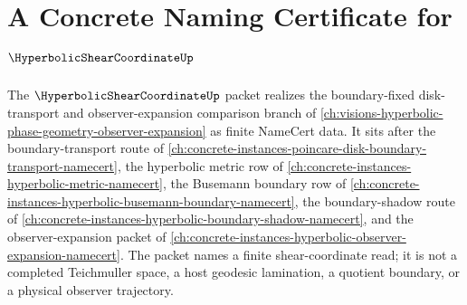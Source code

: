\chapter{A Concrete Naming Certificate for $\HyperbolicShearCoordinateUp$}
\label{ch:concrete-instances-hyperbolic-shear-coordinate-namecert}

The $\HyperbolicShearCoordinateUp$ packet realizes the boundary-fixed disk-transport and observer-expansion comparison branch of \autoref{ch:visions-hyperbolic-phase-geometry-observer-expansion} as finite NameCert data. It sits after the boundary-transport route of \autoref{ch:concrete-instances-poincare-disk-boundary-transport-namecert}, the hyperbolic metric row of \autoref{ch:concrete-instances-hyperbolic-metric-namecert}, the Busemann boundary row of \autoref{ch:concrete-instances-hyperbolic-busemann-boundary-namecert}, the boundary-shadow route of \autoref{ch:concrete-instances-hyperbolic-boundary-shadow-namecert}, and the observer-expansion packet of \autoref{ch:concrete-instances-hyperbolic-observer-expansion-namecert}. The packet names a finite shear-coordinate read; it is not a completed Teichmuller space, a host geodesic lamination, a quotient boundary, or a physical observer trajectory.

